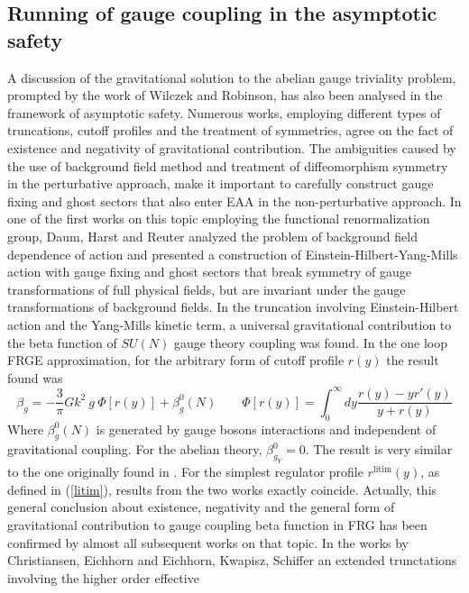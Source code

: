 \documentclass[11pt, a4paper]{article}
\begin{document}
\subsection{Running of gauge coupling in the asymptotic safety}
A discussion of the gravitational solution to the abelian gauge triviality problem, prompted by the work of Wilczek and Robinson,
has also been analysed in the framework of asymptotic safety. Numerous works, employing different types of truncations, cutoff
profiles and the treatment of symmetries, agree on the fact of existence and negativity of gravitational contribution.
The ambiguities caused by the use of background field method and treatment
of diffeomorphism symmetry in the perturbative approach, make it important to carefully construct 
gauge fixing and ghost sectors that also enter EAA in the non-perturbative approach.
In one of the first works on this topic employing the functional renormalization group, Daum, Harst and Reuter \cite{reuter_abelian}
analyzed the problem of background field dependence of action and
presented a construction of Einstein-Hilbert-Yang-Mills action with gauge fixing and ghost sectors that
break symmetry of gauge transformations of full physical fields, but are invariant under the gauge
transformations of background fields. In the truncation involving Einstein-Hilbert action and the Yang-Mills kinetic term,
a universal gravitational contribution to the beta function of $SU(N)$ gauge theory coupling was found.
In the one loop FRGE approximation, for the arbitrary form of cutoff profile $r(y)$ the result found was
\begin{equation}
    \beta_g = - \frac{3}{\pi} Gk^2 \ g \ \Phi[r(y)] + \beta_g^0(N) \qquad \Phi[r(y)] = \int_0^{\infty} dy \frac{r(y) - y r'(y)}{y+r(y)}
\end{equation}
Where $\beta_g^0(N)$ is generated by gauge bosons interactions and independent of gravitational coupling. For the abelian theory, $\beta_{g_{Y}}^0 = 0$. The result is very similar to the one originally found in \cite{wilczek}.
For the simplest regulator profile $r^{\text{litim}}(y)$, as defined in (\ref{litim}), results from the two works exactly coincide.
Actually, this general conclusion about existence, negativity and the general form of gravitational contribution to 
gauge coupling beta function in FRG has been confirmed by almost all subsequent works on that topic.
In the works by Christiansen, Eichhorn \cite{christiansen_eichhorn} and Eichhorn, Kwapisz, Schiffer \cite{kwapisz_eichhorn} an extended trunctations involving the higher order effective
\end{document}
